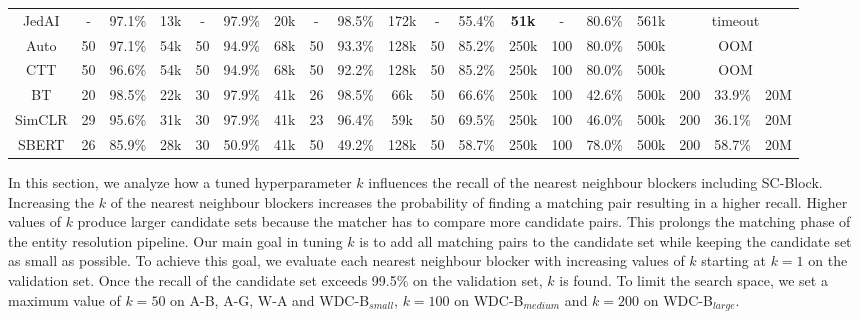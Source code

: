 \documentclass[sigconf,nonacm]{acmart}
\begin{document}
\begin{table*}[ht]
\begin{tabular}{@{}c|ccc|ccc|ccc|ccc|ccc|ccc}
JedAI       & -  & 97.1\%  & 13k & -  & 97.9\%  & 20k & -  & 98.5\% & 172k & - & 55.4\% & \textbf{51k} & - & 80.6\% & 561k &                      \multicolumn{3}{c}{timeout}     \\
Auto        & 50 & 97.1\%  & 54k & 50 & 94.9\%  & 68k & 50 & 93.3\% & 128k & 50 & 85.2\% & 250k & 100 & 80.0\% & 500k &                       \multicolumn{3}{c}{OOM}                            \\
CTT         & 50 & 96.6\%  & 54k & 50 & 94.9\%  & 68k & 50 & 92.2\% & 128k & 50 & 85.2\% & 250k  & 100 & 80.0\% & 500k & \multicolumn{3}{c}{OOM} \\
BT & 20 & 98.5\%  & 22k & 30 & 97.9\%  & 41k & 26 & 98.5\% & 66k  & 50                   & 66.6\%               & 250k               & 100                  & 42.6\%               & 500k               &                       200 & 33.9\% & 20M                            \\
SimCLR      & 29 & 95.6\%  & 31k & 30 & 97.9\%  & 41k & 23 & 96.4\% & 59k  & 50                   & 69.5\%               & 250k               & 100                  & 46.0\%               & 500k               &                       200 & 36.1\% & 20M                        \\
SBERT       & 26 & 85.9\%  & 28k & 30 & 50.9\%  & 41k & 50 & 49.2\% & 128k & 50 & 58.7\% & 250k  & 100 & 78.0\% & 500k & 200 & 58.7\% & 20M                             \\
 \bottomrule
\end{tabular}
\end{table*}

In this section, we analyze how a tuned hyperparameter $k$ influences the recall of the nearest neighbour blockers including SC-Block.
Increasing the $k$ of the nearest neighbour blockers increases the probability of finding a matching pair resulting in a higher recall.
Higher values of $k$ produce larger candidate sets because the matcher has to compare more candidate pairs. This prolongs the matching phase of the entity resolution pipeline.
Our main goal in tuning $k$ is to add all matching pairs to the candidate set while keeping the candidate set as small as possible.
To achieve this goal, we evaluate each nearest neighbour blocker with increasing values of $k$ starting at $k=1$ on the validation set.
Once the recall of the candidate set exceeds 99.5\% on the validation set, $k$ is found.
To limit the search space, we set a maximum value of $k=50$ on A-B, A-G, W-A and WDC-B$_{small}$,  $k=100$ on WDC-B$_{medium}$ and $k=200$ on WDC-B$_{large}$.
\end{document}
